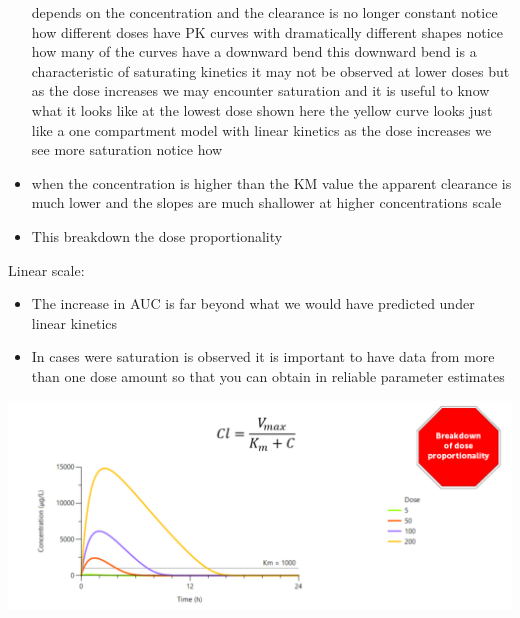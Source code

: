 \documentclass[
  letterpaper,
  DIV=11,
  numbers=noendperiod]{scrreprt}
\providecommand{\tightlist}{%
  \setlength{\itemsep}{0pt}\setlength{\parskip}{0pt}}\usepackage{longtable,booktabs,array}
\begin{document}
\begin{itemize}
  depends on the concentration and the clearance is no longer constant
  notice how different doses have PK curves with dramatically different
  shapes notice how many of the curves have a downward bend this
  downward bend is a characteristic of saturating kinetics it may not be
  observed at lower doses but as the dose increases we may encounter
  saturation and it is useful to know what it looks like at the lowest
  dose shown here the yellow curve looks just like a one compartment
  model with linear kinetics as the dose increases we see more
  saturation notice how
\item
  when the concentration is higher than the KM value the apparent
  clearance is much lower and the slopes are much shallower at higher
  concentrations scale
\item
  This breakdown the dose proportionality
\end{itemize}

Linear scale:

\begin{itemize}
\tightlist
\item
  The increase in AUC is far beyond what we would have predicted under
  linear kinetics
\item
  In cases were saturation is observed it is important to have data from
  more than one dose amount so that you can obtain in reliable parameter
  estimates
\end{itemize}

\includegraphics{./img/saturation-4.png}
\end{document}

